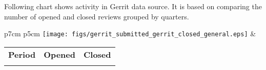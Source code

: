 Following chart shows activity in Gerrit data source. It is based on comparing the number of opened and closed reviews grouped by quarters.

\begin{tabular}{p{7cm} p{5cm}}
	\vspace{0pt} 
	\texttt{[image: figs/gerrit\_submitted\_gerrit\_closed\_general.eps]}
	& 
	\vspace{0pt}
	\begin{tabular}{l|r|r|}%
		\bfseries Period & \bfseries Opened & \bfseries Closed %
		\csvreader[head to column names]{data/gerrit_submitted_gerrit_closed_general.csv}{}%
		{\\ & \submitted & \closed}
	\end{tabular}
\end{tabular}